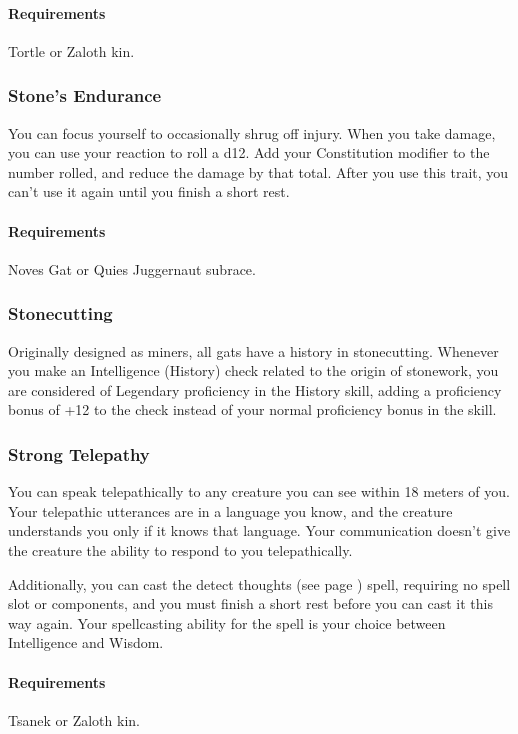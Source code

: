     \paragraph{Requirements} Tortle or Zaloth kin.
\subsubsection{Stone's Endurance} \label{feat::stonesendurance}
    You can focus yourself to occasionally shrug off injury.
    When you take damage, you can use your reaction to roll a d12.
    Add your Constitution modifier to the number rolled, and reduce the damage by that total.
    After you use this trait, you can't use it again until you finish a short rest.
    \paragraph{Requirements} Noves Gat or Quies Juggernaut subrace.
\subsubsection{Stonecutting} \label{feat::stonecutting}
    Originally designed as miners, all gats have a history in stonecutting.
    Whenever you make an Intelligence (History) check related to the origin of stonework, you are considered of Legendary proficiency in the History skill, adding a proficiency bonus of +12 to the check instead of your normal proficiency bonus in the skill.
\subsubsection{Strong Telepathy} \label{feat::strongtelepathy}
    You can speak telepathically to any creature you can see within 18 meters of you.
    Your telepathic utterances are in a language you know, and the creature understands you only if it knows that language.
    Your communication doesn't give the creature the ability to respond to you telepathically.

    Additionally, you can cast the detect thoughts (see page \pageref{spell::detectthoughts}) spell, requiring no spell slot or components, and you must finish a short rest before you can cast it this way again.
    Your spellcasting ability for the spell is your choice between Intelligence and Wisdom.
    \paragraph{Requirements} Tsanek or Zaloth kin.
